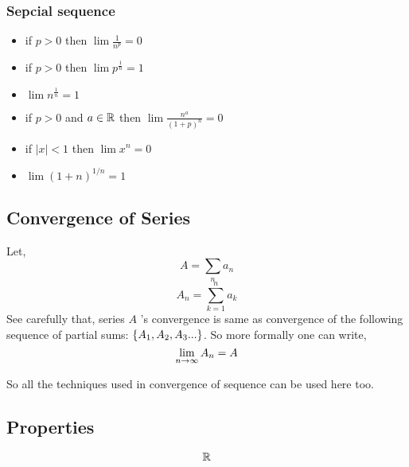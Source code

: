 \documentclass[
]{article}
\providecommand{\tightlist}{%
  \setlength{\itemsep}{0pt}\setlength{\parskip}{0pt}}
\begin{document}
\hypertarget{sepcial-sequence}{%
\subsubsection{Sepcial sequence}\label{sepcial-sequence}}

\begin{itemize}
\tightlist
\item
  if \(p>0\) then \(\lim \frac{1}{n^p} = 0\)
\item
  if \(p>0\) then \(\lim p^{\frac{1}{n}} = 1\)
\item
  \(\lim n^{\frac{1}{n}} = 1\)
\item
  if \(p>0\) and \(a \in \mathbb{R}\) then \(\lim \frac{n^a}{(1+p)^n} = 0\)
\item
  if \(|x|<1\) then \(\lim x^n = 0\)
\item
  \(\lim (1+n)^{1/n} = 1\)
\end{itemize}

\hypertarget{convergence-of-series}{%
\subsection{Convergence of Series}\label{convergence-of-series}}

Let, \[A = \sum_n a_n\] \[ A_n= \sum_{k=1}^{n} a_k\] See carefully that,
series \(A\) 's convergence is same as convergence of the following
sequence of partial sums: \(\left\{A_1, A_2, A_3...\right\}\). So more
formally one can write, \[\lim_{n \rightarrow \infty} A_n = A\]

So all the techniques used in convergence of sequence can be used here
too.

\hypertarget{properties-1}{%
\subsection{Properties}\label{properties-1}}

\[\mathbb{R}\]
\end{document}
